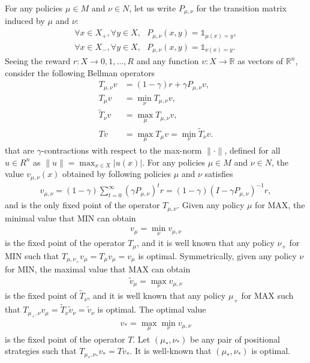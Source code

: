 \documentclass{article}
\def\R{\mathds R}
\def\1{{\mathds 1}}
\begin{document}
For any policies $\mu \in M$ and $\nu \in N$, let us write $P_{\mu,\nu}$ for the transition matrix induced by $\mu$ and $\nu$:
\begin{align}
  \forall x \in X_+, \forall y \in X, ~~~P_{\mu,\nu}(x,y)=\1_{\mu(x)=y}, \\
  \forall x \in X_-, \forall y \in X, ~~~P_{\mu,\nu}(x,y)=\1_{\nu(x)=y}.
\end{align} 
Seeing the reward $r:X \to {0,1,\dots,R}$ and any function $v:X \to \R$ as vectors of $\R^n$, consider the following Bellman operators
\begin{align}
  T_{\mu,\nu}v & = (1-\gamma)r + \gamma P_{\mu,\nu}v, \\
  T_{\mu}v & = \min_{\nu} T_{\mu,\nu}v, \\
  \tilde T_{\nu}v & = \max_\mu T_{\mu,\nu}v, \\
  T v & =\max_\mu T_{\mu }v = \min_\nu \tilde T_{\nu}v.
\end{align}
that are $\gamma$-contractions with respect to the max-norm $\|\cdot\|$, defined for all $u \in R^n$ as $\|u\|=\max_{x \in X} |u(x)|$.
For any policies $\mu \in M$ and $\nu \in N$, the value $v_{\mu,\nu}(x)$ obtained by following policies $\mu$ and $\nu$ satisfies
\begin{align}
v_{\mu,\nu} = (1-\gamma)\sum_{t=0}^\infty (\gamma P_{\mu,\nu})^t r = (1-\gamma)(I-\gamma P_{\mu,\nu})^{-1}r,
\end{align}
and is the only fixed point of the operator $T_{\mu,\nu}$.
Given any policy $\mu$ for MAX, the minimal value that MIN can obtain
\begin{align}
  v_{\mu} = \min_{\nu} v_{\mu,\nu}
\end{align}
is the fixed point of the operator $T_\mu$, and it is well known that any policy $\nu_+$ for MIN such that $T_{\mu,\nu_+}v_\mu = T_\mu v_\mu = v_\mu$ is optimal.
Symmetrically, given any policy $\nu$ for MIN, the maximal value that MAX can obtain
\begin{align}
  \tilde v_{\mu} = \max_{\nu} v_{\mu,\nu}
\end{align}
is the fixed point of $\tilde T_\nu$, and it is well known that any policy $\mu_+$ for MAX such that $T_{\mu_+,\nu}v_\mu = \tilde T_\nu \tilde v_\nu = \tilde v_\nu$ is optimal.
The optimal value
\begin{align}
  v_* = \max_{\mu} \min_{\nu} v_{\mu,\nu}
\end{align}
is the fixed point of the operator $T$. Let $(\mu_*,\nu_*)$ be any pair of positional strategies such that $T_{\mu_*,\nu_*}v_*=T v_*$. It is well-known that $(\mu_*,\nu_*)$ is optimal.
\end{document}
